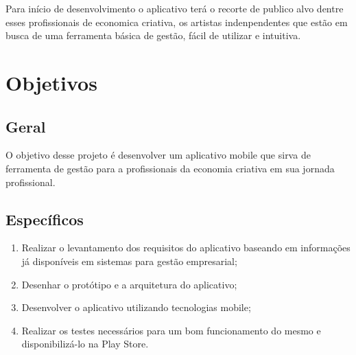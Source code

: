 Para início de desenvolvimento o aplicativo terá o recorte de publico alvo dentre esses profissionais de economica criativa, os artistas indenpendentes que estão em busca de uma ferramenta básica de gestão, fácil de utilizar e intuitiva.

\section{Objetivos}\label{sec:objetivos}

\subsection{Geral}\label{subsec:geral}

O objetivo desse projeto é desenvolver um aplicativo mobile que sirva de ferramenta de gestão para a profissionais da economia criativa em sua jornada profissional.

\subsection{Específicos}\label{subsec:especificos}

\begin{enumerate}
    \item Realizar o levantamento dos requisitos do aplicativo baseando em informações já disponíveis em sistemas para gestão empresarial;
    \item Desenhar o protótipo e a arquitetura do aplicativo;
    \item Desenvolver o aplicativo utilizando tecnologias mobile;
    \item Realizar os testes necessários para um bom funcionamento do mesmo e disponibilizá-lo na Play Store.
\end{enumerate}